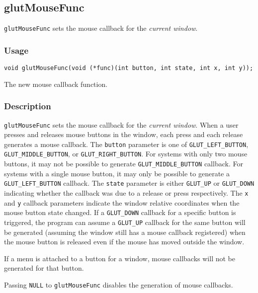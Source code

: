 \subsection{glutMouseFunc}

{\tt glutMouseFunc} sets the mouse callback for the {\em current window}.

\subsubsection*{Usage}

\begin{verbatim}
void glutMouseFunc(void (*func)(int button, int state, int x, int y));
\end{verbatim}
\begin{description}
\itemsep 0in
\item[\tt func]
The new mouse callback function.
\end{description}

\subsubsection*{Description}

{\tt glutMouseFunc} sets the mouse callback for the {\em current window}.
When a user presses and releases mouse buttons in the window, each press
and each release generates a mouse callback.  The {\tt button} parameter
is one of {\tt GLUT\_LEFT\_BUTTON}, {\tt GLUT\_MIDDLE\_BUTTON}, or
{\tt GLUT\_RIGHT\_BUTTON}.  For systems with only two mouse buttons, it may
not be possible to generate {\tt GLUT\_MIDDLE\_BUTTON} callback.  For systems
with a single mouse button, it may only be possible to generate a
{\tt GLUT\_LEFT\_BUTTON} callback.  The {\tt state} parameter is either
{\tt GLUT\_UP} or {\tt GLUT\_DOWN} indicating whether the callback
was due to a release or press respectively.  The {\tt x} and {\tt y} callback
parameters indicate the window relative coordinates when the mouse
button state changed.  If a {\tt GLUT\_DOWN} callback for a specific
button is triggered, the program can assume a {\tt GLUT\_UP} callback for the 
same button will be generated (assuming the window still has a mouse
callback registered) when the mouse button is released even if
the mouse has moved outside the window.

If a menu is attached to a button for a window, mouse callbacks will
not be generated for that button.

Passing {\tt NULL} to {\tt glutMouseFunc} disables
the generation of mouse callbacks.

